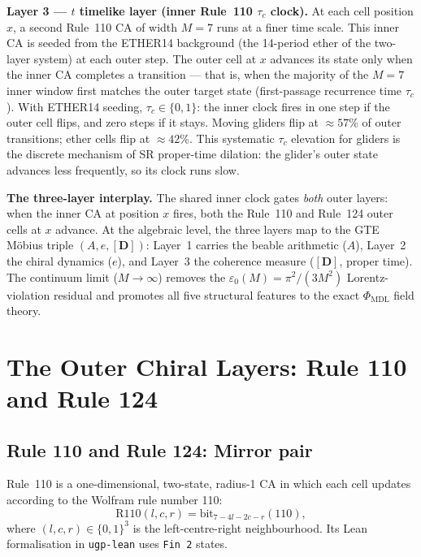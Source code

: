 \documentclass[11pt]{article}
\theoremstyle{remark}
\newcommand{\PHIMDL}{\Phi_{\mathrm{MDL}}}
\newcommand{\lean}[1]{%
  \penalty-100
  \begingroup\def\_{\textunderscore\allowbreak}\texttt{#1}\endgroup}
\newcommand{\epsz}{\varepsilon_0}
\begin{document}
\begin{tcolorbox}[colback=blue!3,colframe=blue!40!black,
  title={\textbf{How the Chiral Minkowski CA works: a layer-by-layer overview}},
  fonttitle=\bfseries,left=8pt,right=8pt,top=6pt,bottom=6pt]
\medskip
\textbf{Layer 3 — $t$ timelike layer (inner Rule~110 $\tau_c$ clock).}
At each cell position $x$, a second Rule~110 CA of width $M = 7$ runs at a
finer time scale.  This inner CA is seeded from the ETHER14 background
(the 14-period ether of the two-layer system) at each outer step.
The outer cell at $x$ advances its state only when the inner CA completes a
transition — that is, when the majority of the $M=7$ inner window first
matches the outer target state (first-passage recurrence time $\tau_c$).
With ETHER14 seeding, $\tau_c \in \{0, 1\}$: the inner clock fires in one step
if the outer cell flips, and zero steps if it stays.
Moving gliders flip at $\approx 57\%$ of outer transitions; ether cells flip at
$\approx 42\%$.  This systematic $\tau_c$ elevation for gliders is the
discrete mechanism of SR proper-time dilation: the glider's outer state
advances less frequently, so its clock runs slow.

\medskip
\textbf{The three-layer interplay.}
The shared inner clock gates \emph{both} outer layers: when the inner CA at
position $x$ fires, both the Rule~110 and Rule~124 outer cells at $x$ advance.
At the algebraic level, the three layers map to the GTE Möbius triple
$(A, e, [\mathbf{D}])$: Layer~1 carries the beable arithmetic ($A$),
Layer~2 the chiral dynamics ($e$), and Layer~3 the coherence measure
($[\mathbf{D}]$, proper time).
The continuum limit ($M \to \infty$) removes the $\epsz(M) = \pi^2/(3M^2)$
Lorentz-violation residual and promotes all five structural features to
the exact $\PHIMDL$ field theory.
\end{tcolorbox}
\medskip

\section{The Outer Chiral Layers: Rule 110 and Rule 124}
\label{sec:twolayer}

\subsection{Rule 110 and Rule 124: Mirror pair}
\label{ssec:mirror}

Rule~110 is a one-dimensional, two-state, radius-1 CA in which each cell
updates according to the Wolfram rule number 110:
\begin{equation}
  \mathrm{R110}(l,c,r) = \text{bit}_{7-4l-2c-r}(110),
\end{equation}
where $(l,c,r)\in\{0,1\}^3$ is the left-centre-right neighbourhood.
Its Lean formalisation in \lean{ugp-lean} uses \lean{Fin~2} states.
\end{document}

